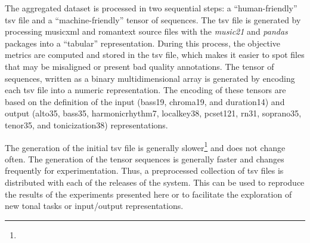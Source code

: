 
The aggregated dataset is processed in two sequential steps:
a ``human-friendly'' \gls{tsv} file and a
``machine-friendly'' tensor of sequences. The \gls{tsv} file
is generated by processing \gls{musicxml} and
\gls{romantext} source files with the \emph{music21}
\parencite{cuthbert2010music21} and \emph{pandas}
\parencite{mckinney2011pandas} packages into a ``tabular''
representation. During this process, the objective metrics
are computed and stored in the \gls{tsv} file, which makes
it easier to spot files that may be misaligned or present
bad quality annotations. The tensor of sequences, written as
a binary  \parencite{oliphant2006guide}
multidimensional array is generated by encoding each
\gls{tsv} file into a numeric representation. The encoding
of these tensors are based on the definition of the input
(\gls{bass19}, \gls{chroma19}, and \gls{duration14}) and
output (\gls{alto35}, \gls{bass35}, \gls{harmonicrhythm7},
\gls{localkey38}, \gls{pcset121}, \gls{rn31},
\gls{soprano35}, \gls{tenor35}, and \gls{tonicization38})
representations.

The generation of the initial \gls{tsv} file is generally
slower\footnote{} and does
not change often. The generation of the tensor sequences is
generally faster and changes frequently for experimentation.
Thus, a preprocessed collection of \gls{tsv} files is
distributed with each of the releases of the system. This
can be used to reproduce the results of the experiments
presented here or to facilitate the exploration of new tonal
tasks or input/output representations.
